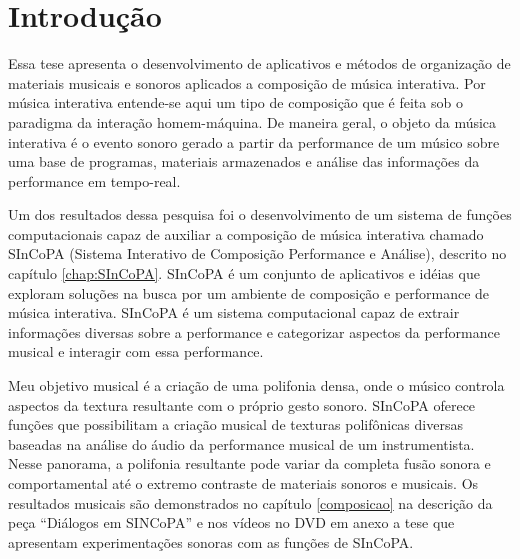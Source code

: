 \documentclass[draft]{ppgmus}
\begin{document}
\tableofcontents
{}

\listoffigures

\mainmatter




\chapter{Introdução}
\label{sec:intro}


Essa tese apresenta o desenvolvimento de aplicativos e métodos
de organização de materiais musicais e sonoros aplicados a composição
de música interativa. Por música interativa entende-se aqui um tipo
de composição que é feita sob o paradigma da interação homem-máquina.
De maneira geral, o objeto da música interativa é o evento sonoro gerado a partir da
performance de um músico sobre uma base de programas, materiais
armazenados e análise das informações da performance em tempo-real.


 Um dos resultados dessa pesquisa foi o desenvolvimento de um sistema de funções computacionais capaz
de auxiliar a composição de música interativa chamado SInCoPA (Sistema Interativo
de Composição Performance e Análise), descrito no capítulo \ref{chap:SInCoPA}.
 SInCoPA é um conjunto de aplicativos e idéias que exploram soluções
na busca por um ambiente de composição e
performance de música interativa. SInCoPA
 é um sistema computacional capaz de extrair informações diversas sobre a performance e
categorizar aspectos da performance musical e interagir com essa performance.


Meu objetivo musical é a criação de uma polifonia densa, onde o músico controla
aspectos da textura resultante com o próprio gesto sonoro. 
SInCoPA oferece funções que possibilitam a criação musical de texturas polifônicas
diversas baseadas na análise do áudio da performance musical de um instrumentista.
Nesse panorama, a
polifonia resultante pode variar da completa fusão sonora e comportamental até o extremo
contraste de materiais sonoros e musicais. Os resultados musicais são demonstrados no
capítulo \ref{composicao} na descrição da peça ``Diálogos em SINCoPA'' e nos vídeos no
DVD em anexo a tese que apresentam experimentações sonoras com as funções de SInCoPA.
\end{document}
